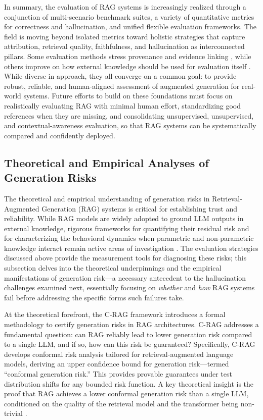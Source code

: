 \documentclass[11pt]{article}
\begin{document}
In summary, the evaluation of RAG systems is increasingly realized through a conjunction of multi-scenario benchmark suites, a variety of quantitative metrics for correctness and hallucination, and unified flexible evaluation frameworks. The field is moving beyond isolated metrics toward holistic strategies that capture attribution, retrieval quality, faithfulness, and hallucination as interconnected pillars. Some evaluation methods stress provenance and evidence linking \cite{ref128}, while others improve on how external knowledge should be used for evaluation itself \cite{ref125,ref124}. While diverse in approach, they all converge on a common goal: to provide robust, reliable, and human-aligned assessment of augmented generation for real-world systems. Future efforts to build on these foundations must focus on realistically evaluating RAG with minimal human effort, standardizing good references when they are missing, and consolidating unsupervised, unsupervised, and contextual-awareness evaluation, so that RAG systems can be systematically compared and confidently deployed.

\subsection{Theoretical and Empirical Analyses of Generation Risks}

The theoretical and empirical understanding of generation risks in Retrieval-Augmented Generation (RAG) systems is critical for establishing trust and reliability. While RAG models are widely adopted to ground LLM outputs in external knowledge, rigorous frameworks for quantifying their residual risk and for characterizing the behavioral dynamics when parametric and non-parametric knowledge interact remain active areas of investigation \cite{ref135}. The evaluation strategies discussed above provide the measurement tools for diagnosing these risks; this subsection delves into the theoretical underpinnings and the empirical manifestations of generation risk---a necessary antecedent to the hallucination challenges examined next, essentially focusing on \emph{whether} and \emph{how} RAG systems fail before addressing the specific forms such failures take.

At the theoretical forefront, the C-RAG framework introduces a formal methodology to certify generation risks in RAG architectures. C-RAG addresses a fundamental question: can RAG reliably lead to lower generation risk compared to a single LLM, and if so, how can this risk be guaranteed? Specifically, C-RAG develops conformal risk analysis tailored for retrieval-augmented language models, deriving an upper confidence bound for generation risk---termed ``conformal generation risk.'' This provides provable guarantees under test distribution shifts for any bounded risk function. A key theoretical insight is the proof that RAG achieves a lower conformal generation risk than a single LLM, conditioned on the quality of the retrieval model and the transformer being non-trivial \cite{ref135}.
\end{document}
